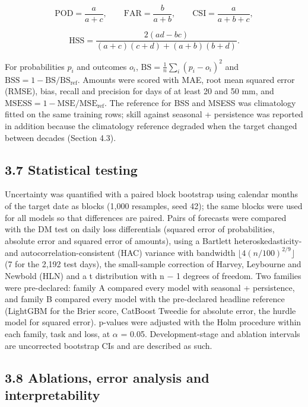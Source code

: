 \documentclass[
]{article}
\begin{document}
\[\mathrm{POD}=\frac{a}{a+c},\qquad \mathrm{FAR}=\frac{b}{a+b},\qquad \mathrm{CSI}=\frac{a}{a+b+c},\]

\[\mathrm{HSS}=\frac{2(ad-bc)}{(a+c)(c+d)+(a+b)(b+d)}.\]

For probabilities \(p_i\) and outcomes \(o_i\), \(\mathrm{BS}=\frac1n\sum_i (p_i-o_i)^2\) and \(\mathrm{BSS}=1-\mathrm{BS}/\mathrm{BS}_{\mathrm{ref}}\). Amounts were scored with MAE, root mean squared error (RMSE), bias, recall and precision for days of at least 20 and 50 mm, and \(\mathrm{MSESS}=1-\mathrm{MSE}/\mathrm{MSE}_{\mathrm{ref}}\). The reference for BSS and MSESS was climatology fitted on the same training rows; skill against seasonal + persistence was reported in addition because the climatology reference degraded when the target changed between decades (Section 4.3).

\hypertarget{statistical-testing}{%
\subsection{3.7 Statistical testing}\label{statistical-testing}}

Uncertainty was quantified with a paired block bootstrap \citep{kunsch1989} using calendar months of the target date as blocks (1,000 resamples, seed 42); the same blocks were used for all models so that differences are paired. Pairs of forecasts were compared with the DM test \citep{diebold1995} on daily loss differentials (squared error of probabilities, absolute error and squared error of amounts), using a Bartlett heteroskedasticity- and autocorrelation-consistent (HAC) variance \citep{newey1987} with bandwidth \(\lfloor 4(n/100)^{2/9}\rfloor\) (7 for the 2,192 test days), the small-sample correction of Harvey, Leybourne and Newbold (HLN) \citep{harvey1997} and a t distribution with n $-$ 1 degrees of freedom. Two families were pre-declared: family A compared every model with seasonal + persistence, and family B compared every model with the pre-declared headline reference (LightGBM for the Brier score, CatBoost Tweedie for absolute error, the hurdle model for squared error). p-values were adjusted with the Holm procedure \citep{holm1979} within each family, task and loss, at $\alpha$ = 0.05. Development-stage and ablation intervals are uncorrected bootstrap CIs and are described as such.

\hypertarget{ablations-error-analysis-and-interpretability}{%
\subsection{3.8 Ablations, error analysis and interpretability}\label{ablations-error-analysis-and-interpretability}}
\end{document}
